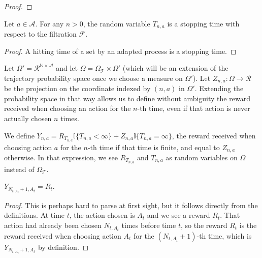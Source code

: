 \begin{proof}\leanok

\end{proof}


\begin{lemma}\label{lem:isStoppingTime_stepsUntil}
  \leanok
Let $a \in \mathcal{A}$. For any $n > 0$, the random variable $T_{n,a}$ is a stopping time with respect to the filtration $\mathcal{F}$.
\end{lemma}

\begin{proof}\leanok
A hitting time of a set by an adapted process is a stopping time.
\end{proof}


Let $\Omega' = \mathcal{R}^{\mathbb{N} \times \mathcal{A}}$ and let $\Omega = \Omega_{\mathcal{T}} \times \Omega'$ (which will be an extension of the trajectory probability space once we choose a measure on $\Omega'$).
Let $Z_{n, a} : \Omega \to \mathcal{R}$ be the projection on the coordinate indexed by $(n,a)$ in $\Omega'$.
Extending the probability space in that way allows us to define without ambiguity the reward received when choosing an action for the $n$-th time, even if that action is never actually chosen $n$ times.


\begin{definition}\label{def:rewardByCount}
  \leanok
We define $Y_{n, a} = R_{T_{n,a}} \mathbb{I}\{T_{n, a} < \infty\} + Z_{n,a} \mathbb{I}\{T_{n, a} = \infty\}$, the reward received when choosing action $a$ for the $n$-th time if that time is finite, and equal to $Z_{n,a}$ otherwise.
In that expression, we see $R_{T_{n,a}}$ and $T_{n, a}$ as random variables on $\Omega$ instead of $\Omega_{\mathcal{T}}$.
\end{definition}


\begin{lemma}\label{lem:rewardByCount_pullCount}
  \leanok
$Y_{N_{t, A_t} + 1, A_t} = R_t$.
\end{lemma}

\begin{proof}\leanok
This is perhaps hard to parse at first sight, but it follows directly from the definitions.
At time $t$, the action chosen is $A_t$ and we see a reward $R_t$.
That action had already been chosen $N_{t, A_t}$ times before time $t$, so the reward $R_t$ is the reward received when choosing action $A_t$ for the $(N_{t, A_t} + 1)$-th time, which is $Y_{N_{t, A_t} + 1, A_t}$ by definition.
\end{proof}



